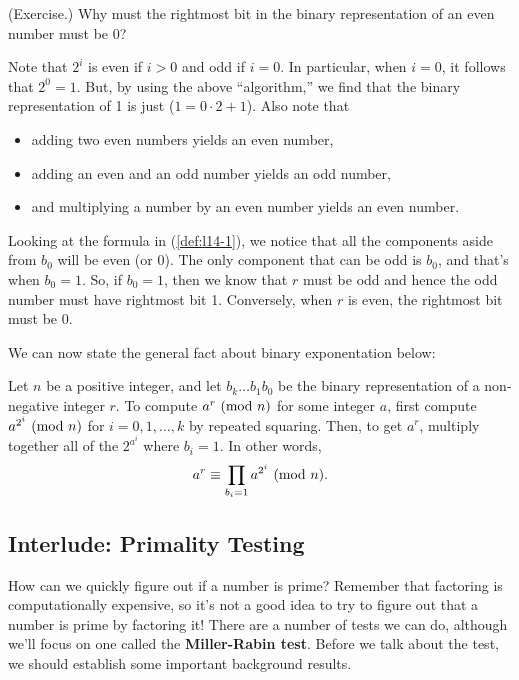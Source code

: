 \documentclass[letterpaper]{article}
\begin{document}
\begin{mdframed}
    (Exercise.) Why must the rightmost bit in the binary representation of an even number must be 0?

    \begin{mdframed}
        Note that $2^i$ is even if $i > 0$ and odd if $i = 0$. In particular, when $i = 0$, it follows that $2^0 = 1$. But, by using the above ``algorithm,'' we find that the binary representation of 1 is just  ($1 = 0 \cdot 2 + 1$). Also note that 
        \begin{itemize}
            \item adding two even numbers yields an even number,
            \item adding an even and an odd number yields an odd number,
            \item and multiplying a number by an even number yields an even number. 
        \end{itemize}
        Looking at the formula in (\ref{def:l14-1}), we notice that all the components aside from $b_0$ will be even (or 0). The only component that can be odd is $b_0$, and that's when $b_0 = 1$. So, if $b_0 = 1$, then we know that $r$ must be odd and hence the odd number must have rightmost bit 1. Conversely, when $r$ is even, the rightmost bit must be 0.
    \end{mdframed}
\end{mdframed}

We can now state the general fact about binary exponentation below: 
\begin{lemma}{}{}
    Let $n$ be a positive integer, and let $b_k \hdots b_1 b_0$ be the binary representation of a non-negative integer $r$. To compute $a^r \ (\mathrm{mod}\ n)$ for some integer $a$, first compute $a^{2^i} \ (\mathrm{mod}\ n)$ for $i = 0, 1, \hdots, k$ by repeated squaring. Then, to get $a^r$, multiply together all of the $2^{a^i}$ where $b_i = 1$. In other words, 
    \[a^r \equiv \prod_{b_i = 1} a^{2^i} \ (\mathrm{mod}\ n).\]
\end{lemma}


\subsection{Interlude: Primality Testing}
How can we quickly figure out if a number is prime? Remember that factoring is computationally expensive, so it's not a good idea to try to figure out that a number is prime by factoring it! There are a number of tests we can do, although we'll focus on one called the \textbf{Miller-Rabin test}. Before we talk about the test, we should establish some important background results. 
\end{document}
